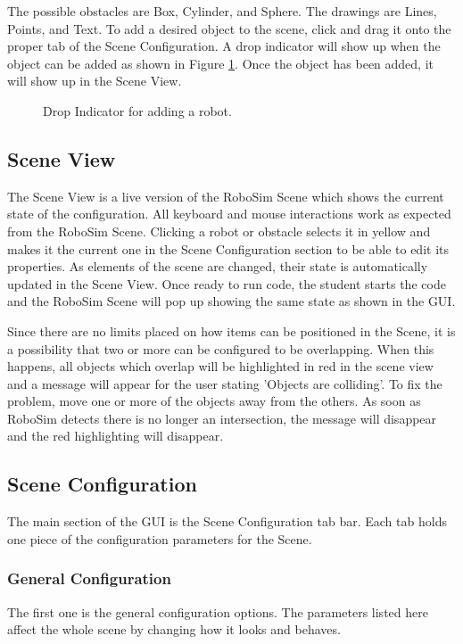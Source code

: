 \documentclass{article}
\begin{document}
The possible obstacles are Box, Cylinder, and Sphere.  The drawings are Lines,
Points, and Text.  To add a desired object to the scene, click and drag it onto
the proper tab of the Scene Configuration.  A drop indicator will show up when
the object can be added as shown in Figure \ref{fig:drop}.  Once the object has
been added, it will show up in the Scene View.
\begin{figure}[H]
	\begin{center}
	\end{center}
	\caption{Drop Indicator for adding a robot.}
	\label{fig:drop}
\end{figure}

\subsection{Scene View}
The Scene View is a live version of the RoboSim Scene which shows the current
state of the configuration.  All keyboard and mouse interactions work as
expected from the RoboSim Scene.  Clicking a robot or obstacle selects it in
yellow and makes it the current one in the Scene Configuration section to be
able to edit its properties.  As elements of the scene are changed, their state
is automatically updated in the Scene View.  Once ready to run code, the student
starts the code and the RoboSim Scene will pop up showing the same state as
shown in the GUI.

Since there are no limits placed on how items can be positioned in the Scene,
it is a possibility that two or more can be configured to be overlapping.  When
this happens, all objects which overlap will be highlighted in red in the scene
view and a message will appear for the user stating 'Objects are colliding'.
To fix the problem, move one or more of the objects away from the others.  As
soon as RoboSim detects there is no longer an intersection, the message will
disappear and the red highlighting will disappear.

\subsection{Scene Configuration}
The main section of the GUI is the Scene Configuration tab bar.  Each tab
holds one piece of the configuration parameters for the Scene.

\subsubsection{General Configuration}
The first one is the general configuration options.  The parameters listed here
affect the whole scene by changing how it looks and behaves.
\end{document}
